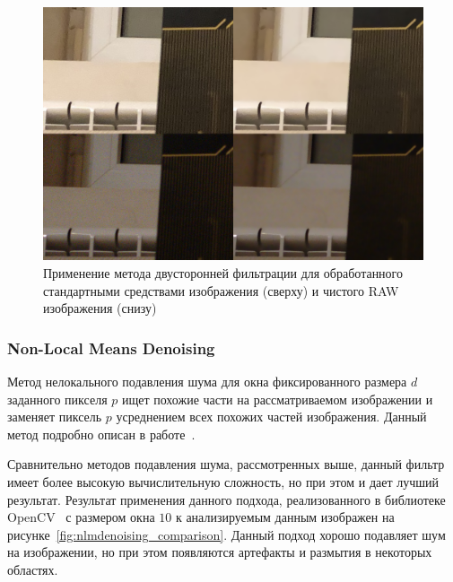 \begin{figure}[h]
	\centering
	\includegraphics[width=\textwidth]{img/bilinear_comparison}
	\caption{Применение метода двусторонней фильтрации для обработанного стандартными средствами изображения (сверху) и чистого RAW изображения (снизу)}
	\label{fig:bilinear_comparison}
\end{figure}

\subsubsection{Non-Local Means Denoising}
Метод нелокального подавления шума для окна фиксированного размера $d$ заданного пикселя $p$ ищет похожие части на рассматриваемом изображении и заменяет пиксель $p$ усреднением всех похожих частей изображения. Данный метод подробно описан в работе~\autocite{NonLocalMeansDenoising}.

Сравнительно методов подавления шума, рассмотренных выше, данный фильтр имеет более высокую вычислительную сложность, но при этом и дает лучший результат. Результат применения данного подхода, реализованного в библиотеке OpenCV~\autocite{OpenCVLib} с размером окна $10$ к анализируемым данным изображен на рисунке~\ref{fig:nlmdenoising_comparison}. Данный подход хорошо подавляет шум на изображении, но при этом появляются артефакты и размытия в некоторых областях.

